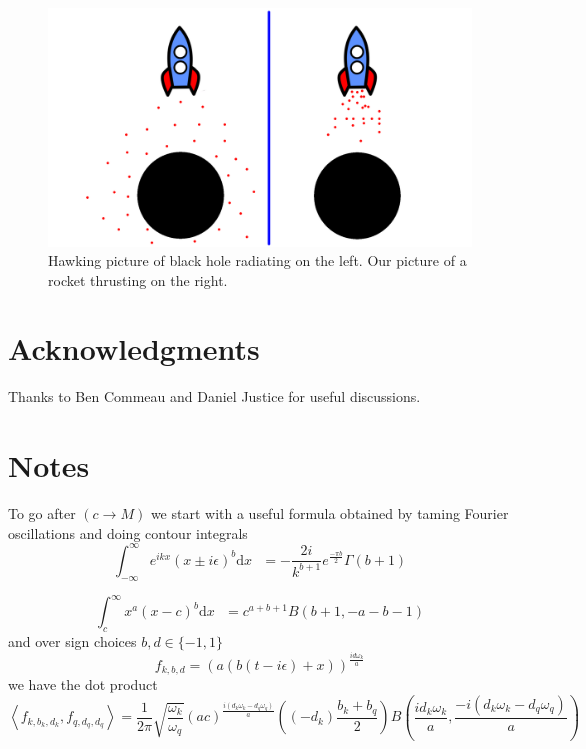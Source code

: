 \documentclass[12pt,a4paper]{article}
\newcommand{\dv}[1]{\mathrm{d} #1 \text{ }}
\begin{document}
\begin{figure}[h]
\centering
\includegraphics[scale=0.5]{rocket.png}
\caption{Hawking picture of black hole radiating on the left. Our picture of a rocket thrusting on the right.}
\label{rocket}
\end{figure}

\section{Acknowledgments}
Thanks to Ben Commeau and Daniel Justice for useful discussions.

\section{Notes}
To go after $(c \rightarrow M)$ we start with a useful formula obtained by taming Fourier oscillations and doing contour integrals
\begin{equation}
  \int_{-\infty}^\infty e^{ikx} (x \pm i \epsilon) ^b \dv{x} = -\frac{2i}{k^{b+1}} e^{\frac{-\pi b}{2}} \Gamma(b+1)
\end{equation}

\begin{equation}
  \int_{c}^\infty x^a (x-c)^b \dv{x} = c^{a+b+1} B(b+1, -a-b-1)
\end{equation}
and over sign choices $b,d \in \{-1,1\}$
\begin{equation}
  f_{k,b,d} = \left(a\left(b(t-i\epsilon)+x\right)\right)^\frac{id\omega_k}{a}
\end{equation}
we have the dot product
\begin{equation}
  \left< f_{k,b_k,d_k}, f_{q,d_q,d_q}\right> = \frac{1}{2\pi} \sqrt{\frac{\omega_k}{\omega_q}} (ac)^\frac{i(d_k\omega_k - d_q \omega_q)}{a} \left((-d_k)\frac{b_k + b_q}{2} \right) B\left(\frac{id_k\omega_k}{a}, \frac{-i(d_k\omega_k - d_q \omega_q)}{a}\right)
\end{equation}





\end{document}
